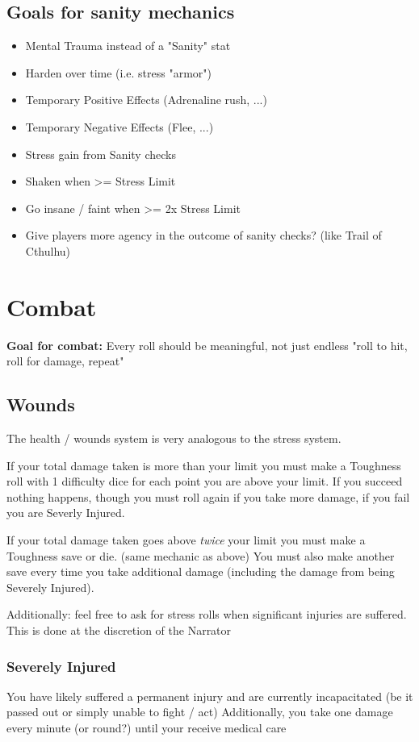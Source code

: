 \section{Goals for sanity mechanics}
\begin{itemize}
    \item Mental Trauma instead of a "Sanity" stat
    \item Harden over time (i.e. stress "armor")
    \item Temporary Positive Effects (Adrenaline rush, ...)
    \item Temporary Negative Effects (Flee, ...)
    \item Stress gain from Sanity checks
    \item Shaken when >= Stress Limit
    \item Go insane / faint when >= 2x Stress Limit
    \item Give players more agency in the outcome of sanity checks? (like Trail of Cthulhu)
\end{itemize}


\chapter{Combat}

\textbf{Goal for combat:} Every roll should be meaningful, not just endless "roll to hit, roll for damage, repeat" 

\section{Wounds}
The health / wounds system is very analogous to the stress system.

If your total damage taken is more than your limit you must make a Toughness roll with 1 difficulty dice for each point you are above your limit.  
If you succeed nothing happens, though you must roll again if you take more damage, if you fail you are Severly Injured.

If your total damage taken goes above \textit{twice} your limit you must make a Toughness save or die. (same mechanic as above)  
You must also make another save every time you take additional damage (including the damage from being Severely Injured).

Additionally: feel free to ask for stress rolls when significant injuries are suffered. This is done at the discretion of the Narrator


\subsection{Severely Injured}
You have likely suffered a permanent injury and are currently incapacitated (be it passed out or simply unable to fight / act)
Additionally, you take one damage every minute (or round?) until your receive medical care


